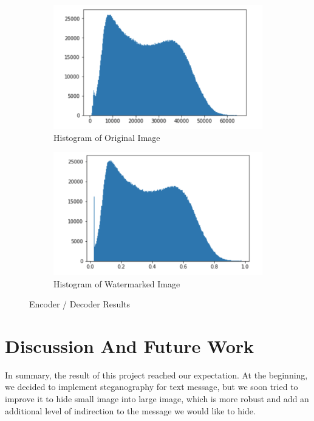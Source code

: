\documentclass{article}
\begin{document}
\begin{figure}[h]
    \centering
    \begin{subfigure}[t]{0.48\textwidth}
        \includegraphics[width=\textwidth]{hist_original}
        \caption{Histogram of Original Image}
    \end{subfigure}
    \begin{subfigure}[t]{0.48\textwidth}
        \includegraphics[width=\textwidth]{hist_water}
        \caption{Histogram of Watermarked Image}
    \end{subfigure}
    \caption{Encoder / Decoder Results}
    \label{fig:histogram}
\end{figure}

\section{Discussion And Future Work}

In summary, the result of this project reached our expectation. At the beginning,
we decided to implement steganography for text message, but we soon tried to
improve it to hide small image into large image, which is more robust and
add an additional level of indirection to the message we would like to hide. \\
\end{document}
